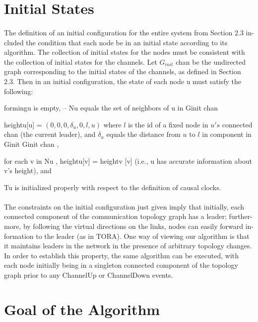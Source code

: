 \section{Initial States}
\paragraph{}The definition of an initial configuration for the entire system from Section 2.3 in- cluded the condition that each node be in an initial state according to its algorithm. The collection of initial states for the nodes must be consistent with the collection of initial states for the channels. Let $G_{init}$ chan be the undirected graph corresponding to the initial states of the channels, as defined in Section 2.3. Then in an initial configuration, the state of each node u must satisfy the following:
\begin{list}{--}{spacing}
	\item formingu is empty, – Nu equals the set of neighbors of u in Ginit chan
	\item heightu[u] = $(0, 0, 0, \delta _u , 0, l, u)$ where $l$ is the id of a fixed node in $u's$ connected chan (the current leader), and $\delta _u$ equals the distance from $u$ to $l$ in component in Ginit Ginit chan ,
	\item for each v in Nu , heightu[v] = heightv [v] (i.e., u has accurate information about v’s height), and
	\item Tu is initialized properly with respect to the definition of causal clocks.
\end{list}
\paragraph{}The constraints on the initial configuration just given imply that initially, each connected component of the communication topology graph has a leader; further- more, by following the virtual directions on the links, nodes can easily forward in- formation to the leader (as in TORA). One way of viewing our algorithm is that it maintains leaders in the network in the presence of arbitrary topology changes. In order to establish this property, the same algorithm can be executed, with each node initially being in a singleton connected component of the topology graph prior to any ChannelUp or ChannelDown events.
\section{Goal of the Algorithm}
